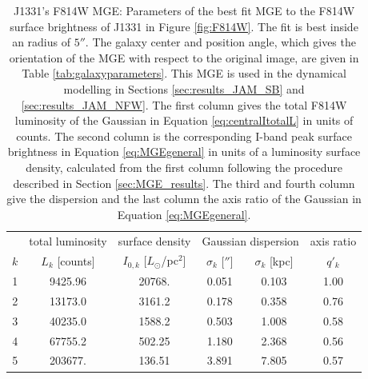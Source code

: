 \begin{table}
\centering
\caption{J1331's F814W MGE: Parameters of the best fit MGE to the F814W surface brightness of J1331 in Figure \ref{fig:F814W}. The fit is best inside an radius of $5''$. The galaxy center and position angle, which gives the orientation of the MGE with respect to the original image, are given in Table \ref{tab:galaxyparameters}. This MGE is used in the dynamical modelling in Sections \ref{sec:results_JAM_SB} and \ref{sec:results_JAM_NFW}.  The first column gives the total F814W luminosity of the Gaussian in Equation \ref{eq:centralItotalL} in units of counts. The second column is the corresponding I-band peak surface brightness in Equation \ref{eq:MGEgeneral} in units of a luminosity surface density, calculated from the first column following the procedure described in Section \ref{sec:MGE_results}. The third and fourth column give the dispersion and the last column the axis ratio of the Gaussian in Equation \ref{eq:MGEgeneral}.}
\begin{tabular}{cccccc}
\hline
 & total luminosity  & surface density & \multicolumn{2}{c}{Gaussian dispersion} & axis ratio\\
$k$  & $L_k$ [counts] & $I_{0,k}$ [$L_\odot$/pc$^2$] & $\sigma_k$ [$''$] & $\sigma_k$ [kpc] & $q'_k$\\\hline
1  &     9425.96 &      20768.  &  0.051   & 0.103  & 1.00\\
2  &    13173.0 &        3161.2 &  0.178   & 0.358  & 0.76\\
3  &    40235.0 &        1588.2 &  0.503   & 1.008  & 0.58\\
4  &    67755.2 &         502.25&  1.180   & 2.368  & 0.56\\
5  &    203677. &         136.51&  3.891   & 7.805  & 0.57\\\hline
\end{tabular}
\label{tab:MGEF814W}
\end{table}


